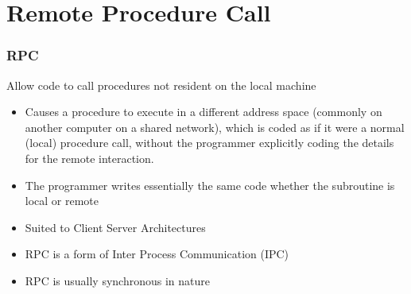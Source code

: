 \documentclass{beamer}
\begin{document}
\section{Remote Procedure Call}
  \begin{frame}
  	\frametitle{RPC}
  	Allow code to call procedures not resident on the local machine
  	\begin{itemize}
  		\item Causes a procedure to execute in a different address space (commonly on another computer on a shared network), which is coded as if it were a normal (local) procedure call, without the programmer explicitly coding the details for the remote interaction. 
  		\item The programmer writes essentially the same code whether the subroutine is local or remote
  		\item Suited to Client Server Architectures
  		\item RPC is a form of Inter Process Communication (IPC)
  		\item RPC is usually synchronous in nature
  	\end{itemize}
  \end{frame}
  
  
  
  
    	
\end{document}
